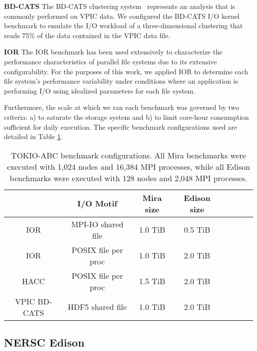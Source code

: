 \textbf{BD-CATS} The BD-CATS clustering system~\cite{Patwary2015} represents
an analysis that is commonly performed on VPIC data.
We configured the BD-CATS I/O kernel benchmark to emulate the I/O workload of
a three-dimensional clustering that reads 75\% of the data
contained in the VPIC data file.

\textbf{IOR} The IOR benchmark has been used extensively
to characterize the performance characteristics of parallel file systems\cite{Yildiz2016,Xie2012,Lofstead2010,Uselton2010}
due to its extensive configurability.  For the purposes of this work, we applied
IOR to determine each file system's performance variability under conditions
where an application is performing I/O using idealized parameters for each
file system.

Furthermore, the scale at which we ran each benchmark was governed by two criteria:
a) to saturate the storage system and
b) to limit core-hour consumption sufficient for daily execution.
The specific benchmark configurations used are detailed in Table \ref{tab:bench-config}.

\begin{table}[h]
\footnotesize
\centering
\begin{tabular}{|c|c|c|c|c|c|c|c|}
\hline
 & \textbf{I/O Motif} & \textbf{Mira size} & \textbf{Edison size} \\
\hline
IOR & MPI-IO shared file & 1.0 TiB & 0.5 TiB\\
\hline
IOR & POSIX file per proc & 1.0 TiB & 2.0 TiB\\
\hline
HACC & POSIX file per proc & 1.5 TiB & 2.0 TiB \\
\hline
VPIC BD-CATS & HDF5 shared file & 1.0 TiB & 2.0 TiB\\
\hline
\end{tabular}
\caption{TOKIO-ABC benchmark configurations. All Mira benchmarks were
executed with 1,024 nodes and 16,384 MPI processes, while all Edison
benchmarks were executed with 128 nodes and 2,048 MPI processes.}
\label{tab:bench-config}
\normalsize
\vspace{-.4in}
\end{table}


\subsection{NERSC Edison} \label{sec:platforms/edison}

